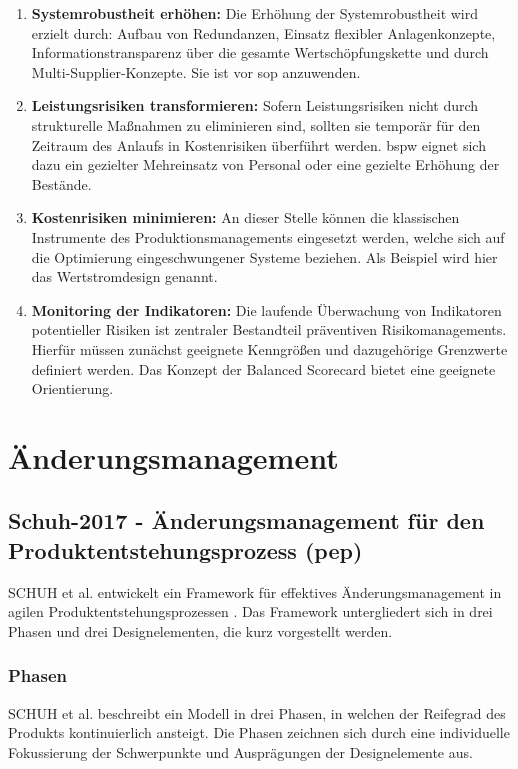 \begin{enumerate}
 \item \textbf{Systemrobustheit erhöhen: }
 Die Erhöhung der Systemrobustheit wird erzielt durch: Aufbau von Redundanzen, Einsatz flexibler Anlagenkonzepte, Informationstransparenz über die gesamte Wertschöpfungskette und durch Multi-Supplier-Konzepte. Sie ist vor \gls{sop} anzuwenden. 
 \item \textbf{Leistungsrisiken transformieren: }
 Sofern Leistungsrisiken nicht durch strukturelle Maßnahmen zu eliminieren sind, sollten sie temporär für den Zeitraum des Anlaufs in Kostenrisiken überführt werden. \Gls{bspw} eignet sich dazu ein gezielter Mehreinsatz von Personal oder eine gezielte Erhöhung der Bestände. 
 \item \textbf{Kostenrisiken minimieren: }
 An dieser Stelle können die klassischen Instrumente des Produktionsmanagements eingesetzt werden, welche sich auf die Optimierung eingeschwungener Systeme beziehen. Als Beispiel wird hier das Wertstromdesign genannt. 
 \item \textbf{Monitoring der Indikatoren: }
 Die laufende Überwachung von Indikatoren potentieller Risiken ist zentraler Bestandteil präventiven Risikomanagements. 
 Hierfür müssen zunächst geeignete Kenngrößen und dazugehörige Grenzwerte definiert werden. Das Konzept der Balanced Scorecard bietet eine geeignete Orientierung. 
\end{enumerate}

\section{Änderungsmanagement}

\subsection*{Schuh-2017 - Änderungsmanagement für den Produktentstehungsprozess (\gls{pep})}\label{sec:schuh2017}
SCHUH et al. entwickelt ein Framework für effektives Änderungsmanagement in agilen Produktentstehungsprozessen \autocite{Schuh2017}. Das Framework untergliedert sich in drei Phasen und drei Designelementen, die kurz vorgestellt werden. 

\subsubsection*{Phasen}
SCHUH et al. beschreibt ein Modell in drei Phasen, in welchen der Reifegrad des Produkts kontinuierlich ansteigt. %
Die Phasen zeichnen sich durch eine individuelle Fokussierung der Schwerpunkte und Ausprägungen der Designelemente aus. 

